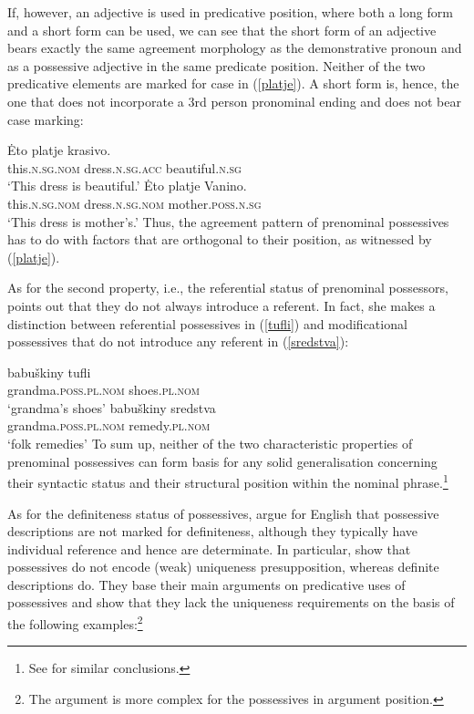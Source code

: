 \documentclass[output=paper,colorlinks,citecolor=brown]{langscibook}
\begin{document}
If, however, an adjective is used in predicative position, where both a long form and a short form can be used, we can see that the short form of an adjective bears exactly the same agreement morphology as the demonstrative pronoun and as a possessive adjective in the same predicate position. Neither of the two predicative elements are marked for case in (\ref{platje}). A short form is, hence, the one that does not incorporate a 3rd person pronominal ending and does not bear case marking: 

\ea \label{platje}
\ea \gll  \.{E}to 			platje 					krasivo. \\
this.\textsc{n.sg.nom}	dress.\textsc{n.sg.acc} 	 beautiful.\textsc{n.sg} \\
\glt `This dress is beautiful.'
\ex \gll \.{E}to 			platje 					Vanino. \\
this.\textsc{n.sg.nom}	dress.\textsc{n.sg.nom} 	mother.\textsc{poss.n.sg} \\
\glt `This dress is mother's.'
\z
\z
\noindent Thus, the agreement pattern of prenominal possessives has to do with factors that are orthogonal to their position, as witnessed by (\ref{platje}). 
\fi

\noindent As for the second property, i.e., the referential status of prenominal possessors, \citet{trugman07} points out that they do not always introduce a referent. In fact, she makes a distinction between referential possessives in (\ref{tufli}) and modificational possessives that do not introduce any referent in (\ref{sredstva}): 

\ea
\ea \label{tufli} \gll 	babu\v{s}kiny 					tufli 		\\
	grandma.\textsc{poss.pl.nom}  	shoes.\textsc{pl.nom} \\
\glt `grandma's shoes'	
\ex \label{sredstva} \gll 	babu\v{s}kiny 					sredstva  \\
	grandma.\textsc{poss.pl.nom} 	remedy.\textsc{pl.nom} \\
\glt `folk remedies'
\z
\z
\noindent To sum up, neither of the two characteristic properties of prenominal possessives can form basis for any solid generalisation concerning their syntactic status and their structural position within the nominal phrase.\footnote{See \citet{gepner21} for similar conclusions.}

As for the definiteness status of possessives, \citet{coppockbeaver15} argue for English that possessive descriptions are not marked for definiteness, although they typically have individual reference and hence are determinate. In particular, \citet{coppockbeaver15} show that possessives do not encode (weak) uniqueness presupposition, whereas definite descriptions do. They base their main arguments on predicative uses of possessives and show that they lack the uniqueness requirements on the basis of the following examples:\footnote{The argument is more complex for the possessives in argument position.} 
\end{document}
